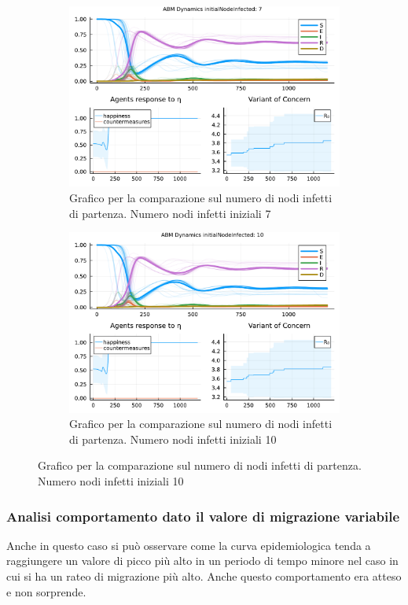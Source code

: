 \begin{figure}[!hb]
\begin{subfigure}[b]{0.45\textwidth}
		\includegraphics[width=\textwidth]{img/SocialNetworkABM_3_II.pdf}
		\caption{Grafico per la comparazione sul numero di nodi infetti di partenza. Numero nodi infetti iniziali 7}
		\label{fig:comparison_init_node_inf_7}
	\end{subfigure}
	\hfill
	\begin{subfigure}[b]{0.45\textwidth}
		\centering
		\includegraphics[width=\textwidth]{img/SocialNetworkABM_4_II.pdf}
		\caption{Grafico per la comparazione sul numero di nodi infetti di partenza. Numero nodi infetti iniziali 10}
		\label{fig:comparison_init_node_inf_10}
	\end{subfigure}
\end{figure}
\newpage

\subsubsection{Analisi comportamento dato il valore di migrazione variabile}
Anche in questo caso si può osservare come la curva epidemiologica tenda a raggiungere un valore 
di picco più alto in un periodo di tempo minore nel caso in cui si ha un rateo di migrazione più alto. 
Anche questo comportamento era atteso e non sorprende.

